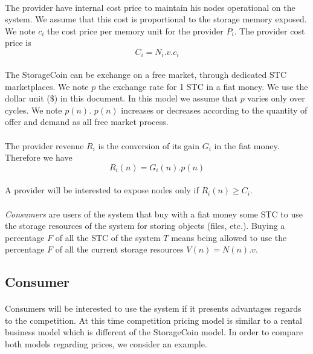 \documentclass[a4paper,12pt]{article}
\begin{document}
\paragraph*{}
The provider have internal cost price to maintain his nodes operational on the system. We assume that this cost is proportional to the storage memory exposed. We note $c_{i}$ the cost price per memory unit for the provider $P_{i}$. The provider cost price is
\[C_{i}=N_{i}.v.c_{i}\]

\paragraph*{}
The StorageCoin can be exchange on a free market, through dedicated STC marketplaces. We note $p$ the exchange rate for 1 STC in a fiat money. We use the dollar unit (\$) in this document.
In this model we assume that $p$ varies only over cycles. We note $p(n)$.
$p(n)$ increases or decreases according to the quantity of offer and demand as all free market process.

\paragraph*{}
The provider revenue $R_{i}$ is the conversion of its gain $G_{i}$ in the fiat money. Therefore we have 
\[R_{i}(n)=G_{i}(n).p(n)\]

\paragraph*{}
A provider will be interested to expose nodes only if $R_{i}(n)\ge{C_{i}}$.

\paragraph*{}
\emph{Consumers} are users of the system that buy with a fiat money some STC to use the storage resources of the system for storing objects (files, etc.). Buying a percentage $F$ of all the STC of the system $T$ means being allowed to use the percentage $F$ of all the current storage resources $V(n)=N(n).v$.

\subsection{Consumer}
\paragraph*{}
Consumers will be interested to use the system if it presents advantages regards to the competition.
At this time competition pricing model is similar to a rental business model which is different of the StorageCoin model. 
In order to compare both models regarding prices, we consider an example.
\end{document}
